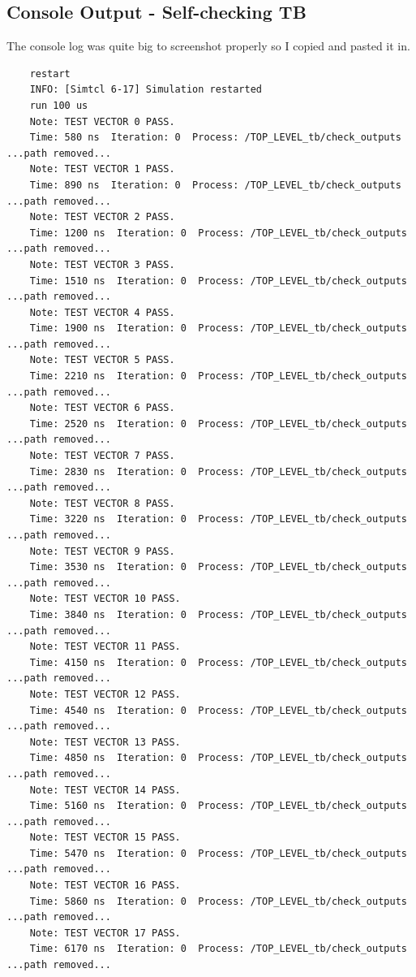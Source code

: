 \documentclass[11pt]{report}
\begin{document}
\newpage

\subsection*{Console Output - Self-checking TB}
The console log was quite big to screenshot properly so I copied and pasted it in.
\begin{verbatim}
    restart
    INFO: [Simtcl 6-17] Simulation restarted
    run 100 us
    Note: TEST VECTOR 0 PASS.
    Time: 580 ns  Iteration: 0  Process: /TOP_LEVEL_tb/check_outputs  ...path removed...
    Note: TEST VECTOR 1 PASS.
    Time: 890 ns  Iteration: 0  Process: /TOP_LEVEL_tb/check_outputs  ...path removed...
    Note: TEST VECTOR 2 PASS.
    Time: 1200 ns  Iteration: 0  Process: /TOP_LEVEL_tb/check_outputs  ...path removed...
    Note: TEST VECTOR 3 PASS.
    Time: 1510 ns  Iteration: 0  Process: /TOP_LEVEL_tb/check_outputs  ...path removed...
    Note: TEST VECTOR 4 PASS.
    Time: 1900 ns  Iteration: 0  Process: /TOP_LEVEL_tb/check_outputs  ...path removed...
    Note: TEST VECTOR 5 PASS.
    Time: 2210 ns  Iteration: 0  Process: /TOP_LEVEL_tb/check_outputs  ...path removed...
    Note: TEST VECTOR 6 PASS.
    Time: 2520 ns  Iteration: 0  Process: /TOP_LEVEL_tb/check_outputs  ...path removed...
    Note: TEST VECTOR 7 PASS.
    Time: 2830 ns  Iteration: 0  Process: /TOP_LEVEL_tb/check_outputs  ...path removed...
    Note: TEST VECTOR 8 PASS.
    Time: 3220 ns  Iteration: 0  Process: /TOP_LEVEL_tb/check_outputs  ...path removed...
    Note: TEST VECTOR 9 PASS.
    Time: 3530 ns  Iteration: 0  Process: /TOP_LEVEL_tb/check_outputs  ...path removed...
    Note: TEST VECTOR 10 PASS.
    Time: 3840 ns  Iteration: 0  Process: /TOP_LEVEL_tb/check_outputs  ...path removed...
    Note: TEST VECTOR 11 PASS.
    Time: 4150 ns  Iteration: 0  Process: /TOP_LEVEL_tb/check_outputs  ...path removed...
    Note: TEST VECTOR 12 PASS.
    Time: 4540 ns  Iteration: 0  Process: /TOP_LEVEL_tb/check_outputs  ...path removed...
    Note: TEST VECTOR 13 PASS.
    Time: 4850 ns  Iteration: 0  Process: /TOP_LEVEL_tb/check_outputs  ...path removed...
    Note: TEST VECTOR 14 PASS.
    Time: 5160 ns  Iteration: 0  Process: /TOP_LEVEL_tb/check_outputs  ...path removed...
    Note: TEST VECTOR 15 PASS.
    Time: 5470 ns  Iteration: 0  Process: /TOP_LEVEL_tb/check_outputs  ...path removed...
    Note: TEST VECTOR 16 PASS.
    Time: 5860 ns  Iteration: 0  Process: /TOP_LEVEL_tb/check_outputs  ...path removed...
    Note: TEST VECTOR 17 PASS.
    Time: 6170 ns  Iteration: 0  Process: /TOP_LEVEL_tb/check_outputs  ...path removed...

\end{verbatim}
\end{document}
